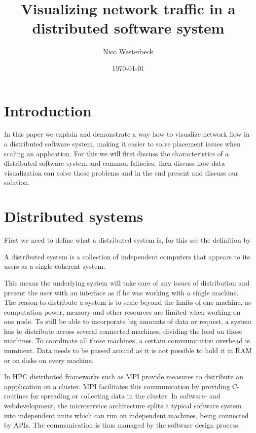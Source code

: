 \documentclass[]{paper}
\begin{document}
\title{Visualizing network traffic in a distributed software system}
\author{Nico Westerbeck}
\date{\today}
\maketitle{}
\tableofcontents

\section{Introduction}

In this paper we explain and demonstrate a way how to visualize network flow in a distributed software system, making it easier to solve placement issues when scaling an application. For this we will first discuss the characteristics of a distributed software system and common fallacies, then discuss how data visualization can solve those problems and in the end present and discuss our solution.

\section{Distributed systems}

First we need to define what a distributed system is, for this see the definition by \cite{Tanenbaum}
\begin{displayquote}
A distributed system is a collection of independent computers that
appears to its users as a single coherent system.
\end{displayquote}
This means the underlying system will take care of any issues of distribution and present the user with an interface as if he was working with a single machine. The reason to distribute a system is to scale beyond the limits of one machine, as computation power, memory and other resources are limited when working on one node. To still be able to incorporate big amounts of data or request, a system has to distribute across several connected machines, dividing the load on those machines. To coordinate all those machines, a certain communication overhead is imminent. Data needs to be passed around as it is not possible to hold it in RAM or on disks on every machine. 

In HPC distributed frameworks such as MPI \cite{MPI} provide measures to distribute an appplication on a cluster. MPI facilitates this communication by providing C-routines for spreading or collecting data in the cluster. In software- and webdevelopment, the microservice architecture \cite{martinfowler2014microservices} splits a typical software system into independent units which can run on independent machines, being connected by APIs. The communication is thus managed by the software design process.
\end{document}
